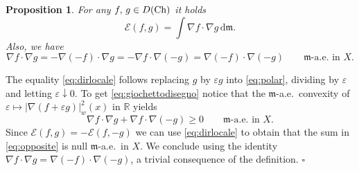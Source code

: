 \documentclass[reqno,11pt]{article}
\numberwithin{equation}{section}
\newcommand{\C}{\mathbb{C}}
\newcommand{\R}{\mathbb{R}}
\newcommand{\mm}{{\mbox{\boldmath$m$}}}
\renewcommand{\d}{{\mathrm d}}
\newcommand{\eps}{\varepsilon}
\newenvironment{proof}{\removelastskip\par\medskip   %
\noindent{\em Proof.}
\rm}{\penalty-20\null\hfill$\square$\par\medbreak}
\newtheorem{proposition}[theorem]{Proposition}
\newcommand{\weakgrad}[1]{|\nabla #1|_w}                %
\renewcommand{\C}{{\rm Ch}}
\renewcommand{\mm}{\mathfrak m}
\begin{document}
\begin{proposition}
For any $f,\,g\in D(\C)$ it holds
\begin{equation}
\label{eq:dirlocale}
\mathcal E(f,g)=\int \nabla f\cdot\nabla g\,\d\mm.
\end{equation}
Also, we have
\begin{equation}
\label{eq:giochettodisegno} \nabla f\cdot\nabla
g=-\nabla(-f)\cdot\nabla g=-\nabla f\cdot\nabla(- g)=\nabla
(-f)\cdot\nabla(- g)\qquad\text{$\mm$-a.e.~in $X$.}
\end{equation}
\end{proposition}
\begin{proof}
The equality \eqref{eq:dirlocale} follows replacing $g$ by $\eps g$
into \eqref{eq:polar}, dividing by $\eps$ and letting
$\eps\downarrow 0$. To get \eqref{eq:giochettodisegno} notice that
the $\mm$-a.e.~convexity of $\eps\mapsto \weakgrad{(f+\eps g)}^2(x)$
in $\R$ yields
\begin{equation}\label{eq:opposite}
\nabla f\cdot\nabla g+\nabla f\cdot\nabla(- g)\geq
0\qquad\text{$\mm$-a.e.~in $X$.}
\end{equation}
Since $\mathcal E(f,g)=-\mathcal E(f,-g)$ we can use
\eqref{eq:dirlocale} to obtain that the sum in \eqref{eq:opposite}
is null $\mm$-a.e.~in $X$. We conclude using the identity $\nabla
f\cdot\nabla g=\nabla (-f)\cdot\nabla(-g)$, a trivial consequence of
the definition.
\end{proof}
\end{document}
